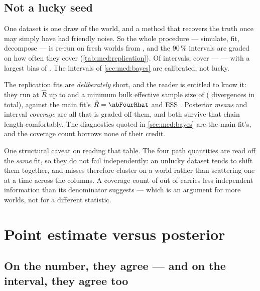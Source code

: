 \subsection*{Not a lucky seed}

One dataset is one draw of the world, and a method that recovers the truth once may simply have had
friendly noise. So the whole procedure --- simulate, fit, decompose --- is re-run on
\nbFourRepSeeds{} fresh worlds from , and the 90\,\% intervals are
graded on how often they cover (\cref{tab:med:replication}). Of \nbFourRepIntervals{} intervals,
\nbFourRepCovered{} cover --- \pc{\nbFourRepCovPct} --- with a largest bias of \nbFourRepMaxBias.
The intervals of \cref{sec:med:bayes} are calibrated, not lucky.

The replication fits are \emph{deliberately} short, and the reader is entitled to know it: they run
at $\hat R$ up to \nbFourRepMaxRhat{} and a minimum bulk effective sample size of \nbFourRepMinEss{}
(\nbFourRepDivergences{} divergences in total), against the main fit's $\hat R = \nbFourRhat$ and ESS
\nbFourEss. Posterior \emph{means} and interval \emph{coverage} are all that is graded off them, and
both survive that chain length comfortably. The diagnostics quoted in \cref{sec:med:bayes} are the
main fit's, and the coverage count borrows none of their credit.



One structural caveat on reading that table. The four path quantities are read off the \emph{same}
fit, so they do not fail independently: an unlucky dataset tends to shift them together, and misses
therefore cluster on a world rather than scattering one at a time across the columns. A coverage
count of \nbFourRepCovered{} out of \nbFourRepIntervals{} carries less independent information than
its denominator suggests --- which is an argument for more worlds, not for a different statistic.

\section{Point estimate versus posterior}
\label{sec:med:compare}



\subsection*{On the number, they agree --- and on the interval, they agree too}

